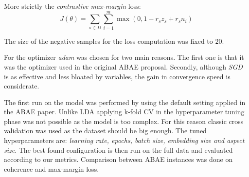 More strictly the \textit{contrastive max-margin} loss:
$$J(\theta) = \sum_{s\in D}\sum_{i=1}^m \max(0, 1 - r_sz_s + r_sn_i)$$

The size of the negative samples for the loss computation was fixed to $20$.

For the optimizer \textit{adam} was chosen for two main reasons.
The first one is that it was the optimizer used in the original ABAE proposal.
Secondly, although \textit{SGD} is as effective\cite{wilson2018marginal} and less bloated
by variables, the gain in convergence speed is considerate.

The first run on the model was performed by using the default setting applied in the ABAE paper.
Unlike LDA applying k-fold CV in the hyperparameter tuning phase was not possible as the model is too complex.
For this reason classic cross validation was used as the dataset should be big enough.
The tuned hyperparameters are: \textit{learning rate, epochs, batch size, embedding size and aspect size}.
The best found configuration is then run on the full data and evaluated according to our metrics.
Comparison between ABAE instances was done on coherence and max-margin loss.